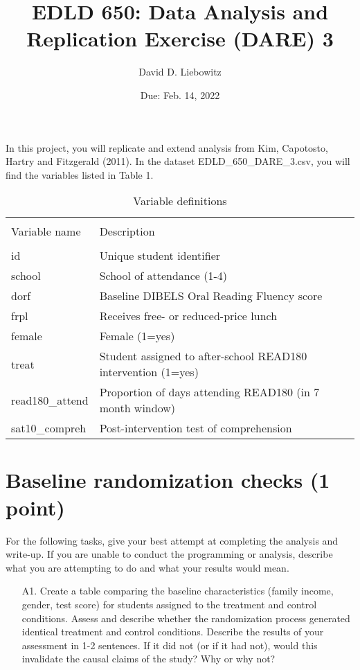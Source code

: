 \documentclass[a4paper, 11pt]{article}
\title{EDLD 650: Data Analysis and Replication Exercise (DARE) 3}
\author{David D. Liebowitz}
\date{Due: Feb. 14, 2022}
\begin{document}
\maketitle

In this project, you will replicate and extend analysis from Kim, Capotosto, Hartry and Fitzgerald (2011). In the dataset EDLD\_650\_DARE\_3.csv, you will find the variables listed in Table 1. 

\begin{table}[!htbp] \centering 
  \caption{Variable definitions} 
  \label{} 
\begin{tabular}{ll} 
\\[-1.8ex]\hline 
\\[-1.8ex] Variable name & Description \\ 
\hline \\[-1.8ex]
id & Unique student identifier \\
school & School of attendance (1-4) \\
dorf & Baseline DIBELS Oral Reading Fluency score \\
frpl & Receives free- or reduced-price lunch \\
female & Female (1=yes) \\
treat & Student assigned to after-school READ180 intervention (1=yes) \\
read180\_attend & Proportion of days attending READ180 (in 7 month window) \\
sat10\_compreh & Post-intervention test of comprehension \\

\hline
\hline

\end{tabular}
\end{table}

\section{Baseline randomization checks (1 point)}
For the following tasks, give your best attempt at completing the analysis and write-up. If you are unable to conduct the programming or analysis, describe what you are attempting to do and what your results would mean.

\begin{enumerate}
	\item[A1.] Create a table comparing the baseline characteristics (family income, gender, test score) for students assigned to the treatment and control conditions. Assess and describe whether the randomization process generated identical treatment and control conditions. Describe the results of your assessment in 1-2 sentences. If it did not (or if it had not), would this invalidate the causal claims of the study? Why or why not?

\end{enumerate}
\end{document}
